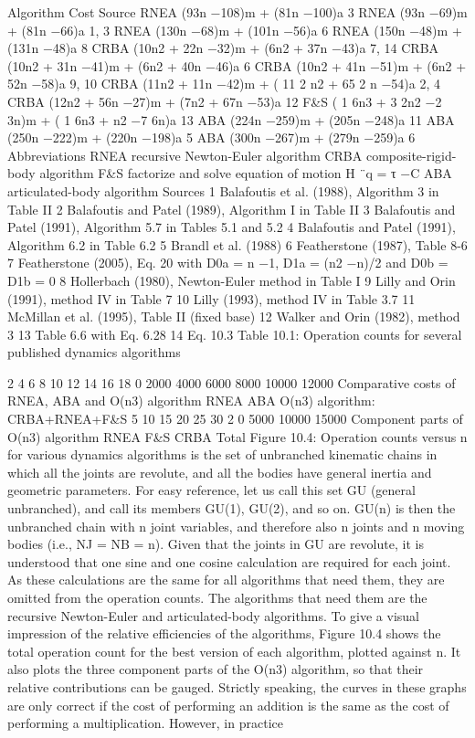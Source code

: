 Algorithm Cost Source RNEA (93n −108)m + (81n −100)a 3 RNEA (93n −69)m + (81n −66)a 1, 3 RNEA (130n −68)m + (101n −56)a 6 RNEA (150n −48)m + (131n −48)a 8 CRBA (10n2 + 22n −32)m + (6n2 + 37n −43)a 7, 14 CRBA (10n2 + 31n −41)m + (6n2 + 40n −46)a 6 CRBA (10n2 + 41n −51)m + (6n2 + 52n −58)a 9, 10 CRBA (11n2 + 11n −42)m + ( 11 2 n2 + 65 2 n −54)a 2, 4 CRBA (12n2 + 56n −27)m + (7n2 + 67n −53)a 12 F\&S ( 1 6n3 + 3 2n2 −2 3n)m + ( 1 6n3 + n2 −7 6n)a 13 ABA (224n −259)m + (205n −248)a 11 ABA (250n −222)m + (220n −198)a 5 ABA (300n −267)m + (279n −259)a 6 Abbreviations RNEA recursive Newton-Euler algorithm CRBA composite-rigid-body algorithm F\&S factorize and solve equation of motion H ¨q = τ −C ABA articulated-body algorithm Sources 1 Balafoutis et al. (1988), Algorithm 3 in Table II 2 Balafoutis and Patel (1989), Algorithm I in Table II 3 Balafoutis and Patel (1991), Algorithm 5.7 in Tables 5.1 and 5.2 4 Balafoutis and Patel (1991), Algorithm 6.2 in Table 6.2 5 Brandl et al. (1988) 6 Featherstone (1987), Table 8-6 7 Featherstone (2005), Eq. 20 with D0a = n −1, D1a = (n2 −n)/2 and D0b = D1b = 0 8 Hollerbach (1980), Newton-Euler method in Table I 9 Lilly and Orin (1991), method IV in Table 7 10 Lilly (1993), method IV in Table 3.7 11 McMillan et al. (1995), Table II (fixed base) 12 Walker and Orin (1982), method 3 13 Table 6.6 with Eq. 6.28 14 Eq. 10.3 Table 10.1: Operation counts for several published dynamics algorithms

2 4 6 8 10 12 14 16 18 0 2000 4000 6000 8000 10000 12000 Comparative costs of RNEA, ABA and O(n3) algorithm RNEA ABA O(n3) algorithm: CRBA+RNEA+F\&S 5 10 15 20 25 30 2 0 5000 10000 15000 Component parts of O(n3) algorithm RNEA F\&S CRBA Total Figure 10.4: Operation counts versus n for various dynamics algorithms is the set of unbranched kinematic chains in which all the joints are revolute, and all the bodies have general inertia and geometric parameters. For easy reference, let us call this set GU (general unbranched), and call its members GU(1), GU(2), and so on. GU(n) is then the unbranched chain with n joint variables, and therefore also n joints and n moving bodies (i.e., NJ = NB = n). Given that the joints in GU are revolute, it is understood that one sine and one cosine calculation are required for each joint. As these calculations are the same for all algorithms that need them, they are omitted from the operation counts. The algorithms that need them are the recursive Newton-Euler and articulated-body algorithms. To give a visual impression of the relative efficiencies of the algorithms, Figure 10.4 shows the total operation count for the best version of each algorithm, plotted against n. It also plots the three component parts of the O(n3) algorithm, so that their relative contributions can be gauged. Strictly speaking, the curves in these graphs are only correct if the cost of performing an addition is the same as the cost of performing a multiplication. However, in practice

